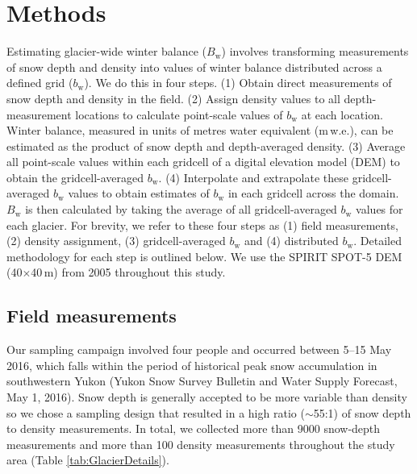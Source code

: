 \documentclass[twocolumn, letterpaper]{igs}
\begin{document}
\section{Methods}

Estimating glacier-wide winter balance ($B_\mathrm{w}$) involves transforming measurements of snow depth and density into values of winter balance distributed across a defined grid ($b_\mathrm{w}$). We do this in four steps. (1) Obtain direct measurements of snow depth and density in the field. (2) Assign density values to all depth-measurement locations to calculate point-scale values of $b_\mathrm{w}$ at each location. Winter balance, measured in units of metres water equivalent (m\,w.e.), can be estimated as the product of snow depth and depth-averaged density. (3) Average all point-scale values within each gridcell of a digital elevation model (DEM) to obtain the gridcell-averaged $b_\mathrm{w}$. (4) Interpolate and extrapolate these gridcell-averaged $b_\mathrm{w}$ values to obtain estimates of $b_\mathrm{w}$ in each gridcell across the domain. $B_\mathrm{w}$ is then calculated by taking the average of all gridcell-averaged $b_\mathrm{w}$ values for each glacier. For brevity, we refer to these four steps as (1) field measurements, (2) density assignment, (3) gridcell-averaged $b_\mathrm{w}$ and (4) distributed $b_\mathrm{w}$. Detailed methodology for each step is outlined below. We use the SPIRIT SPOT-5 DEM (40$\times$40\,m) from 2005 \citep{Korona2009} throughout this study. 

\subsection{Field measurements}

Our sampling campaign involved four people and occurred between 5--15 May 2016, which falls within the period of historical peak snow accumulation in southwestern Yukon (Yukon Snow Survey Bulletin and Water Supply Forecast, May 1, 2016). Snow depth is generally accepted to be more variable than density \citep{Elder1991, Clark2011, Lopez2013} so we chose a sampling design that resulted in a high ratio ($\sim$55:1) of snow depth to density measurements. In total, we collected more than 9000 snow-depth measurements and more than 100 density measurements throughout the study area (Table \ref {tab:GlacierDetails}).
\end{document}
